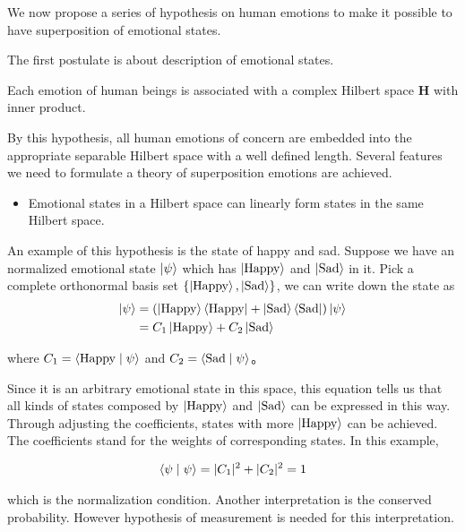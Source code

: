 \documentclass[%
 aip,
 jmp,%
 amsmath,amssymb,
 reprint,%
]{revtex4-1}
\begin{document}
We now propose a series of hypothesis on human emotions to make it possible to have superposition of emotional states.

The first postulate is about description of emotional states.

\begin{guess}
Each emotion of human beings is associated with a complex Hilbert space $\mathbf H$ with inner product.
\end{guess}

By this hypothesis, all human emotions of concern are embedded into the appropriate separable Hilbert space with a well defined length. Several features we need to formulate a theory of superposition emotions are achieved.

\begin{itemize}
\item
Emotional states in a Hilbert space can linearly form states in the same Hilbert space.
\end{itemize}

An example of this hypothesis is the state of happy and sad. Suppose we have an normalized emotional state $\left| \psi\right\rangle$ which has $\left| \mathrm {Happy}\right\rangle$ and $\left| \mathrm{Sad}\right\rangle$ in it. Pick a complete orthonormal basis set $\{ \left| \mathrm {Happy}\right\rangle, \left| \mathrm{Sad}\right\rangle \}$, we can write down the state as
\begin{align}
\left| \psi\right\rangle & = \left(\left| \mathrm{Happy}\right\rangle\left\langle \mathrm{Happy}\right| + \left| \mathrm{Sad}\right\rangle\left\langle \mathrm{Sad}\right| \right)\left| \psi\right\rangle \\
&= C_1\left| \mathrm{Happy}\right\rangle + C_2 \left| \mathrm{Sad}\right\rangle
\end{align}

where $C_1 = \langle \mathrm{Happy} \mid \psi \rangle$ and $C_2 = \langle \mathrm{Sad} \mid \psi \rangle$。

Since it is an arbitrary emotional state in this space, this equation tells us that all kinds of states composed by $\left| \mathrm{Happy}\right\rangle$ and $\left| \mathrm{Sad}\right\rangle$ can be expressed in this way. Through adjusting the coefficients, states with more $\left| \mathrm{Happy}\right\rangle$ can be achieved. The coefficients stand for the weights of corresponding states. In this example, 

\begin{align}
\langle \psi \mid \psi \rangle= |C_1|^2 + |C_2|^2 =1
\end{align}

which is the normalization condition. Another interpretation is the conserved probability. However hypothesis of measurement is needed for this interpretation.
\end{document}
